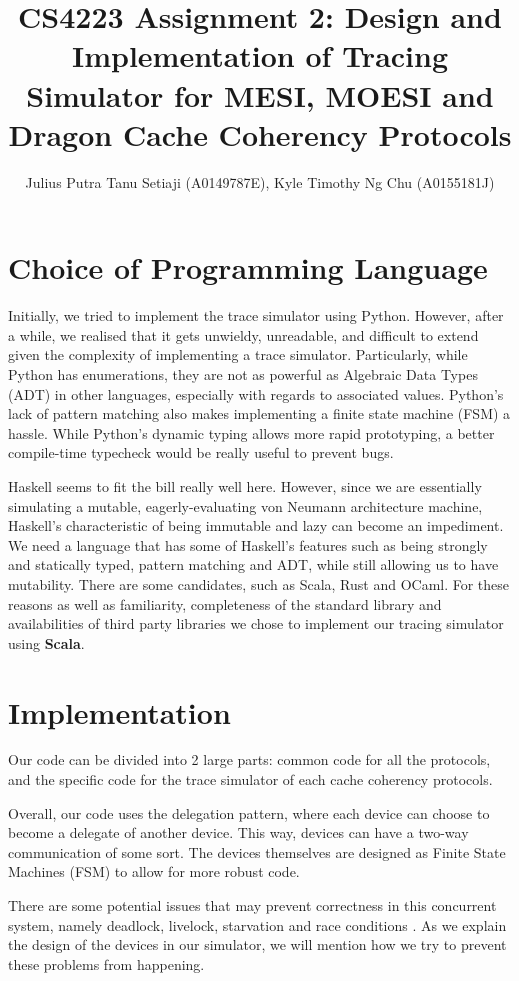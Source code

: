 \documentclass[nonacm,acmsmall,screen,11pt]{acmart}
\title{CS4223 Assignment 2: Design and Implementation of Tracing Simulator for MESI, MOESI and Dragon Cache Coherency Protocols}
\author{Julius Putra Tanu Setiaji (A0149787E), Kyle Timothy Ng Chu (A0155181J)}
\begin{document}
\maketitle

\tableofcontents

\section{Choice of Programming Language}
Initially, we tried to implement the trace simulator using Python.
However, after a while, we realised that it gets unwieldy, unreadable, and difficult to extend given the complexity of implementing a trace simulator.
Particularly, while Python has enumerations, they are not as powerful as Algebraic Data Types (ADT) in other languages, especially with regards to associated values.
Python's lack of pattern matching also makes implementing a finite state machine (FSM) a hassle.
While Python's dynamic typing allows more rapid prototyping, a better compile-time typecheck would be really useful to prevent bugs.

Haskell seems to fit the bill really well here.
However, since we are essentially simulating a mutable, eagerly-evaluating von Neumann architecture machine, Haskell's characteristic of being immutable and lazy can become an impediment.
We need a language that has some of Haskell's features such as being strongly and statically typed, pattern matching and ADT, while still allowing us to have mutability.
There are some candidates, such as Scala, Rust and OCaml.
For these reasons as well as familiarity, completeness of the standard library and availabilities of third party libraries we chose to implement our tracing simulator using \textbf{Scala}.

\section{Implementation}
Our code can be divided into 2 large parts: common code for all the protocols, and the specific code for the trace simulator of each cache coherency protocols.

Overall, our code uses the delegation pattern, where each device can choose to become a delegate of another device.
This way, devices can have a two-way communication of some sort.
The devices themselves are designed as Finite State Machines (FSM) to allow for more robust code.

There are some potential issues that may prevent correctness in this concurrent system, namely deadlock, livelock, starvation and race conditions \cite{Culler:1998:PCA:2821564}.
As we explain the design of the devices in our simulator, we will mention how we try to prevent these problems from happening.
\end{document}
